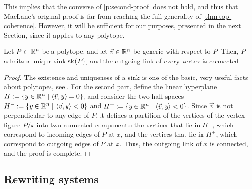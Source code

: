 This implies that the converse of \cref{p:second-proof} does not hold, and thus that MacLane's original proof is far from reaching the full generality of \cref{thm:top-coherence}.
However, it will be sufficient for our purposes, presented in the next Section, since it applies to any polytope.

\begin{proposition}
\label{prop:polytopes}
    Let $P \subset \mathbb R^n$ be a polytope, and let $\vec v \in \mathbb R^n$ be generic with respect to $P$. 
    Then, $P$ admits a unique sink $\mathrm{sk}(P)$, and
    the outgoing link of every vertex is  connected.
\end{proposition}

\begin{proof}
    The existence and uniqueness of a sink is one of the basic, very useful facts about polytopes, see \cite[Theorem 3.7]{Ziegler95}.
    For the second part, define the linear hyperplane $H:=\{y \in \mathbb R^n \ | \ \langle \vec v, y \rangle = 0\}$, and consider the two half-spaces $H^{-}:=\{y \in \mathbb R^n \ | \ \langle \vec v, y \rangle < 0\}$ and $H^{+}:=\{y \in \mathbb R^n \ | \ \langle \vec v, y \rangle < 0\}$.
    Since $\vec v$ is not perpendicular to any edge of $P$, it defines a partition of the vertices of the vertex figure $P/x$ into two connected components: the vertices that lie in $H^{-}$, which correspond to incoming edges of $P$ at $x$, and the vertices that lie in $H^{+}$, which correspond to outgoing edges of $P$ at $x$.
    Thus, the outgoing link of $x$ is connected, and the proof is complete.
\end{proof}


\subsection{Rewriting systems}


